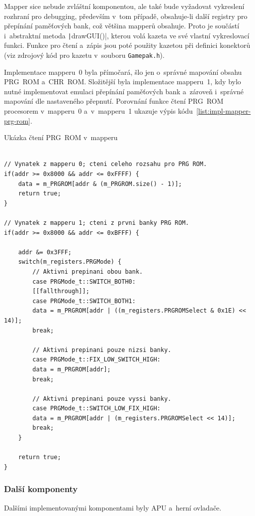 Mapper sice nebude zvláštní komponentou, ale také bude vyžadovat vykreslení rozhraní pro debugging, především v~tom případě, obsahuje-li další registry pro přepínání paměťových bank, což většina mapperů obsahuje. Proto je součástí i~abstraktní metoda \texttt|drawGUI()|, kterou volá kazeta ve své vlastní vykreslovací funkci. Funkce pro čtení a~zápis jsou poté použity kazetou při definici konektorů (viz zdrojový kód pro kazetu v~souboru \texttt{Gamepak.h}).

Implementace mapperu~0 byla přímočará, šlo jen o~správné mapování obsahu PRG~ROM a~CHR~ROM. Složitější byla implementace mapperu~1, kdy bylo nutné implementovat emulaci přepínání paměťových bank a~zároveň i~správné mapování dle nastaveného přepnutí. Porovnání funkce čtení PRG~ROM procesorem v~mapperu~0 a~v~mapperu~1 ukazuje výpis kódu~\ref{list:impl-mapper-prg-rom}.

\begin{listing}
	\caption{Ukázka čtení PRG~ROM v~mapperu}
	\label{list:impl-mapper-prg-rom}
	\begin{verbatim}

// Vynatek z mapperu 0; cteni celeho rozsahu pro PRG ROM.
if(addr >= 0x8000 && addr <= 0xFFFF) {
	data = m_PRGROM[addr & (m_PRGROM.size() - 1)];
	return true;
}

// Vynatek z mapperu 1; cteni z prvni banky PRG ROM.
if(addr >= 0x8000 && addr <= 0xBFFF) {
	
	addr &= 0x3FFF;	
	switch(m_registers.PRGMode) {
		// Aktivni prepinani obou bank.
		case PRGMode_t::SWITCH_BOTH0:
		[[fallthrough]];
		case PRGMode_t::SWITCH_BOTH1:
		data = m_PRGROM[addr | ((m_registers.PRGROMSelect & 0x1E) << 14)];
		break;
		
		// Aktivni prepinani pouze nizsi banky.
		case PRGMode_t::FIX_LOW_SWITCH_HIGH:
		data = m_PRGROM[addr];
		break;
		
		// Aktivni prepinani pouze vyssi banky.
		case PRGMode_t::SWITCH_LOW_FIX_HIGH:
		data = m_PRGROM[addr | (m_registers.PRGROMSelect << 14)];
		break;
	}
	
	return true;
}
	\end{verbatim}
\end{listing}

\subsubsection{Další komponenty}
Dalšími implementovanými komponentami byly APU a~herní ovladače.

